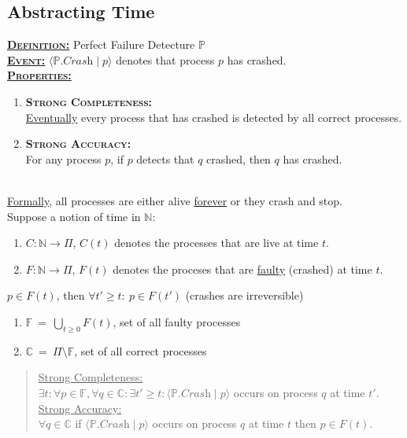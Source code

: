 \documentclass{article}
\begin{document}
\begin{adjustwidth}{2em}{2em}
		\subsection{Abstracting Time}
		\begin{adjustwidth}{2em}{2em}
			\underline{\textbf{\textsc{Definition:}}} Perfect Failure Detecture $\mathbb{P}$ \\
			\underline{\textbf{\textsc{Event:}}} $\langle \mathbb{P}.\textit{Crash} \mid p \rangle$ denotes that process $p$ has crashed. \\
			\underline{\textbf{\textsc{Properties:}}}
			\begin{enumerate}[]
				\item \textsc{\textbf{Strong Completeness:}} \\
				\underline{Eventually} every process that has crashed is detected by all correct processes.
				\item \textsc{\textbf{Strong Accuracy:}} \\
				For any process $p$, if $p$ detects that $q$ crashed, then $q$ has crashed.
			\end{enumerate}
			\hfill \\
			\underline{Formally}, all processes are either alive \underline{forever} or they crash and stop. \\
			Suppose a notion of time in $\mathbb{N}$:
			\begin{enumerate}[]
				\item $C: \mathbb{N} \rightarrow \Pi$, $C(t)$ denotes the processes that are live at time $t$.
				\item $F: \mathbb{N} \rightarrow \Pi$, $F(t)$ denotes the proceses that are \underline{faulty} (crashed) at time $t$.
			\end{enumerate}
			$p \in F(t)$, then $\forall t' \geq t: \ p \in F(t')$ (crashes are irreversible)
			\begin{enumerate}[]
				\item $\mathbb{F} \ = \ \bigcup_{t \geq 0} F(t)$, set of all faulty processes
				\item $\mathbb{C} \ = \ \Pi \setminus \mathbb{F}$, set of all correct processes
			\end{enumerate}
			\begin{quote}
				\underline{Strong Completeness:} \\
				$\exists t: \forall p \in \mathbb{F}, \forall q \in \mathbb{C}: \exists t' \geq t: \langle \mathbb{P}.\textit{Crash} \mid p \rangle$ occurs on process $q$ at time $t'$. \\
				\underline{Strong Accuracy:} \\
				$\forall q \in \mathbb{C}$ if $\langle \mathbb{P}.\textit{Crash} \mid p \rangle$ occurs on process $q$ at time $t$ then $p \in F(t)$.
			\end{quote}

\end{adjustwidth}
\end{adjustwidth}
\end{document}
